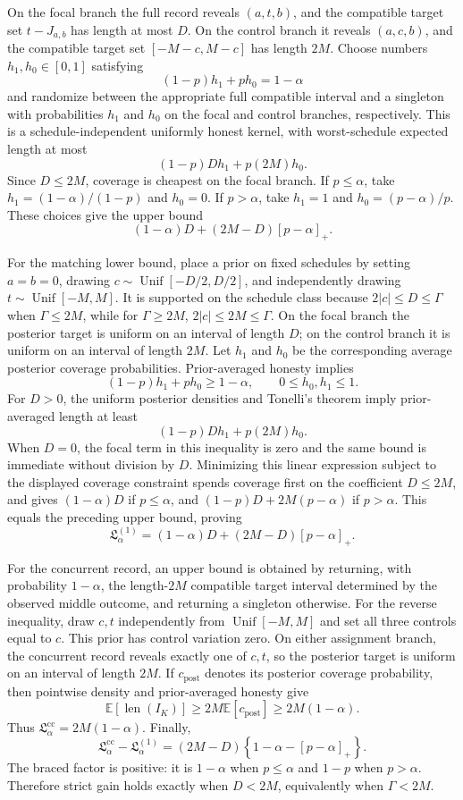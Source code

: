 On the focal branch the full record reveals \((a,t,b)\), and the compatible target set \(t-J_{a,b}\) has length at most \(D\).  On the control branch it reveals \((a,c,b)\), and the compatible target set \([-M-c,M-c]\) has length \(2M\).  Choose numbers \(h_1,h_0\in[0,1]\) satisfying
\[
 (1-p)h_1+ph_0=1-\alpha
\]
and randomize between the appropriate full compatible interval and a singleton with probabilities \(h_1\) and \(h_0\) on the focal and control branches, respectively.  This is a schedule-independent uniformly honest kernel, with worst-schedule expected length at most
\[
 (1-p)Dh_1+p(2M)h_0.
\]
Since \(D\le2M\), coverage is cheapest on the focal branch.  If \(p\le\alpha\), take \(h_1=(1-\alpha)/(1-p)\) and \(h_0=0\).  If \(p>\alpha\), take \(h_1=1\) and \(h_0=(p-\alpha)/p\).  These choices give the upper bound
\[
 (1-\alpha)D+(2M-D)[p-\alpha]_+.
\]

For the matching lower bound, place a prior on fixed schedules by setting \(a=b=0\), drawing \(c\sim\operatorname{Unif}[-D/2,D/2]\), and independently drawing \(t\sim\operatorname{Unif}[-M,M]\).  It is supported on the schedule class because \(2|c|\le D\le\Gamma\) when \(\Gamma\le2M\), while for \(\Gamma\ge2M\), \(2|c|\le2M\le\Gamma\).  On the focal branch the posterior target is uniform on an interval of length \(D\); on the control branch it is uniform on an interval of length \(2M\).  Let \(h_1\) and \(h_0\) be the corresponding average posterior coverage probabilities.  Prior-averaged honesty implies
\[
 (1-p)h_1+ph_0\ge1-\alpha,
 \qquad 0\le h_0,h_1\le1.
\]
For \(D>0\), the uniform posterior densities and Tonelli's theorem imply prior-averaged length at least
\[
 (1-p)Dh_1+p(2M)h_0.
\]
When \(D=0\), the focal term in this inequality is zero and the same bound is immediate without division by \(D\).
Minimizing this linear expression subject to the displayed coverage constraint spends coverage first on the coefficient \(D\le2M\), and gives \((1-\alpha)D\) if \(p\le\alpha\), and \((1-p)D+2M(p-\alpha)\) if \(p>\alpha\).  This equals the preceding upper bound, proving
\[
 \mathfrak L_\alpha^{(1)}
 =(1-\alpha)D+(2M-D)[p-\alpha]_+.
\]

For the concurrent record, an upper bound is obtained by returning, with probability \(1-\alpha\), the length-\(2M\) compatible target interval determined by the observed middle outcome, and returning a singleton otherwise.  For the reverse inequality, draw \(c,t\) independently from \(\operatorname{Unif}[-M,M]\) and set all three controls equal to \(c\).  This prior has control variation zero.  On either assignment branch, the concurrent record reveals exactly one of \(c,t\), so the posterior target is uniform on an interval of length \(2M\).  If \(c_{\mathrm{post}}\) denotes its posterior coverage probability, then pointwise density and prior-averaged honesty give
\[
 \mathbb E[\operatorname{len}(I_K)]
 \ge2M\mathbb E[c_{\mathrm{post}}]
 \ge2M(1-\alpha).
\]
Thus \(\mathfrak L_\alpha^{\mathrm{cc}}=2M(1-\alpha)\).  Finally,
\[
 \mathfrak L_\alpha^{\mathrm{cc}}-\mathfrak L_\alpha^{(1)}
 =(2M-D)\left\{1-\alpha-[p-\alpha]_+\right\}.
\]
The braced factor is positive: it is \(1-\alpha\) when \(p\le\alpha\) and \(1-p\) when \(p>\alpha\).  Therefore strict gain holds exactly when \(D<2M\), equivalently when \(\Gamma<2M\).

